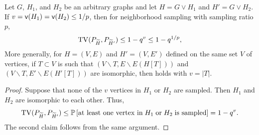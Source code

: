 \begin{lemma} \label{lmm:lower-complete}
Let $ G $, $ H_1 $, and $ H_2 $ be an arbitrary graphs and let $ H = G \vee H_1 $ and $ H' = G \vee H_2 $. If $ v = {\mathsf{v}}(H_1) = {\mathsf{v}}(H_2) \leq 1/p $, then for neighborhood sampling with sampling ratio $p$,
\begin{equation}
{\rm TV}(P_{{\widetilde{H}}}, P_{{\widetilde{H}}'}) \leq 1 - q^{v} \leq 1-q^{1/p},
\label{eq:tvHH}
\end{equation}
More generally, for $H=(V,E)$ and $H'=(V,E')$ defined on the same set $V$ of vertices, if $T\subset V$ is such that $(V\backslash T, E\backslash E(H[T]))$ and $(V\backslash T, E'\backslash E(H'[T]))$ are isomorphic, then  holds with $v=|T|$.
\end{lemma}
\begin{proof}
Suppose that none of the $ v $ vertices in $ H_1 $ or $ H_2 $ are sampled. Then $ H_1 $ and $ H_2 $ are isomorphic to each other. Thus,
\begin{equation*}
{\rm TV}(P_{{\widetilde{H}}}, P_{{\widetilde{H}}'}) \leq \mathbb{P}\left[\text{at least one vertex in} \;   H_1 \; \text{or} \; H_2 \; \text{is sampled}\right] = 1 - q^{v}.
\end{equation*}
The second claim follows from the same argument.
\end{proof}


